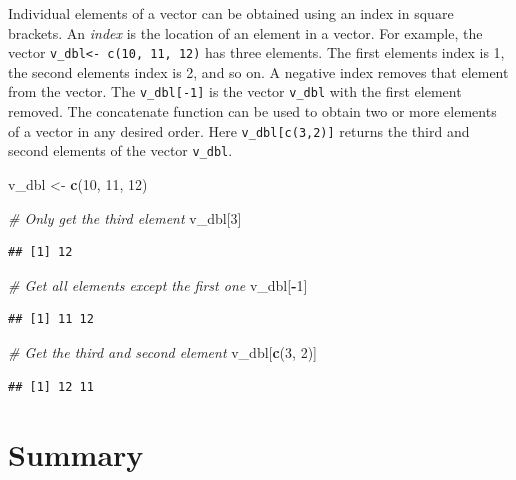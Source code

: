 \documentclass[
]{book}
\newenvironment{Shaded}{\begin{snugshade}}{\end{snugshade}}
\newcommand{\CommentTok}[1]{\textcolor[rgb]{0.56,0.35,0.01}{\textit{#1}}}
\newcommand{\DecValTok}[1]{\textcolor[rgb]{0.00,0.00,0.81}{#1}}
\newcommand{\KeywordTok}[1]{\textcolor[rgb]{0.13,0.29,0.53}{\textbf{#1}}}
\newcommand{\NormalTok}[1]{#1}
\newcommand{\OperatorTok}[1]{\textcolor[rgb]{0.81,0.36,0.00}{\textbf{#1}}}
\newcommand{\StringTok}[1]{\textcolor[rgb]{0.31,0.60,0.02}{#1}}
\begin{document}
Individual elements of a vector can be obtained using an index in square brackets. An \emph{index} is the location of an element in a vector. For example, the vector \texttt{v\_dbl\textless{}-\ c(10,\ 11,\ 12)} has three elements. The first elements index is 1, the second elements index is 2, and so on. A negative index removes that element from the vector. The \texttt{v\_dbl{[}-1{]}} is the vector \texttt{v\_dbl} with the first element removed. The concatenate function can be used to obtain two or more elements of a vector in any desired order. Here \texttt{v\_dbl{[}c(3,2){]}} returns the third and second elements of the vector \texttt{v\_dbl}.

\begin{Shaded}
\begin{Highlighting}[]
\NormalTok{v_dbl <-}\StringTok{ }\KeywordTok{c}\NormalTok{(}\DecValTok{10}\NormalTok{, }\DecValTok{11}\NormalTok{, }\DecValTok{12}\NormalTok{)}

\CommentTok{# Only get the third element}
\NormalTok{v_dbl[}\DecValTok{3}\NormalTok{]}
\end{Highlighting}
\end{Shaded}

\begin{verbatim}
## [1] 12
\end{verbatim}

\begin{Shaded}
\begin{Highlighting}[]
\CommentTok{# Get all elements except the first one}
\NormalTok{v_dbl[}\OperatorTok{-}\DecValTok{1}\NormalTok{]}
\end{Highlighting}
\end{Shaded}

\begin{verbatim}
## [1] 11 12
\end{verbatim}

\begin{Shaded}
\begin{Highlighting}[]
\CommentTok{# Get the third and second element}
\NormalTok{v_dbl[}\KeywordTok{c}\NormalTok{(}\DecValTok{3}\NormalTok{, }\DecValTok{2}\NormalTok{)]}
\end{Highlighting}
\end{Shaded}

\begin{verbatim}
## [1] 12 11
\end{verbatim}

\hypertarget{summary}{%
\section*{Summary}\label{summary}}
\end{document}
